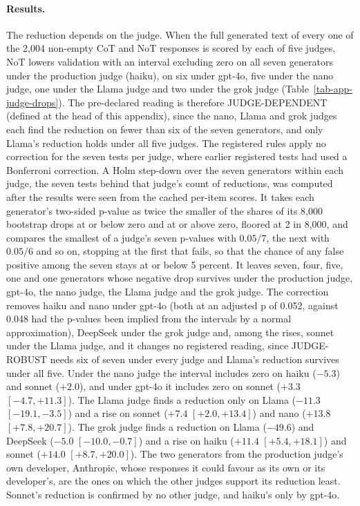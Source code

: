 \paragraph{Results.}
The reduction depends on the judge. When the full generated text of every one
of the 2,004 non-empty CoT and NoT responses is scored by each of five judges,
NoT lowers
validation with an interval excluding zero on all seven generators under the
production judge (haiku), on six under gpt-4o, five under the nano judge, one
under the Llama judge and two under the grok judge
(Table~\ref{tab-app-judge-drops}). The pre-declared reading is therefore
JUDGE-DEPENDENT (defined at the head of this appendix), since the nano, Llama
and grok judges each find the reduction on fewer than six of the seven
generators, and only Llama's reduction holds under all five judges.
The registered rules apply no correction for the seven tests per judge, where
earlier registered tests had used a Bonferroni correction. A Holm step-down
over the seven generators within each judge, the seven tests behind that
judge's count of reductions, was computed after the results were seen from
the cached per-item scores. It takes each generator's
two-sided p-value as twice the smaller of the shares of its 8,000 bootstrap
drops at or below zero and at or above zero, floored at 2 in 8,000, and
compares the smallest of a judge's seven p-values with $0.05/7$, the next
with $0.05/6$ and so on, stopping at the first that fails, so that the chance
of any false positive among the seven stays at or below 5 percent. It leaves
seven, four, five, one and one generators whose negative drop survives under
the production judge, gpt-4o, the nano judge, the Llama judge and the grok
judge. The
correction removes haiku and nano under gpt-4o (both at an adjusted p of
0.052, against 0.048 had the p-values been implied from the intervals by a
normal approximation), DeepSeek under the grok judge and, among the rises,
sonnet under the Llama judge, and it changes no registered reading, since
JUDGE-ROBUST needs six of seven under every judge and Llama's reduction
survives under all five.
Under the nano judge the interval includes zero on haiku
($-5.3$) and sonnet ($+2.0$), and under gpt-4o it includes zero on sonnet
($+3.3$ $[-4.7, +11.3]$). The Llama judge finds a reduction only on Llama
($-11.3$ $[-19.1, -3.5]$) and a rise on sonnet ($+7.4$ $[+2.0, +13.4]$) and
nano ($+13.8$ $[+7.8, +20.7]$). The grok judge finds a reduction on Llama
($-49.6$) and DeepSeek ($-5.0$ $[-10.0, -0.7]$) and a rise on haiku ($+11.4$
$[+5.4, +18.1]$) and sonnet ($+14.0$ $[+8.7, +20.0]$).
The two generators from the production judge's own developer, Anthropic,
whose responses it could favour as its own or its developer's, are the ones
on which the other judges support its reduction least. Sonnet's reduction is
confirmed by no other judge, and haiku's only by gpt-4o.

